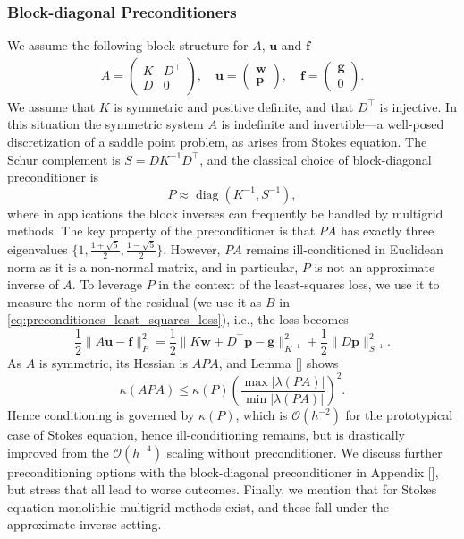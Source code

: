\documentclass{article} %
\begin{document}
\subsubsection{Block-diagonal Preconditioners} We assume the following block structure for $A$, $\mathbf u$ and $\mathbf f$
\begin{align*}
   A = 
   \begin{pmatrix}
      K & D^\top \\ 
      D & 0   
   \end{pmatrix},
   \quad
   \mathbf u = 
   \begin{pmatrix}
      \mathbf w \\
      \mathbf p
   \end{pmatrix},
   \quad
   \mathbf f =
   \begin{pmatrix}
      \mathbf g \\
      0
   \end{pmatrix}.
\end{align*}
We assume that $K$ is symmetric and positive definite, and that $D^\top$ is injective. In this situation the symmetric system $A$ is indefinite and invertible---a well-posed discretization of a saddle point problem, as arises from Stokes equation. The Schur complement is $S=DK^{-1}D^\top$, and the classical choice of block-diagonal preconditioner is
\begin{equation*}
   P \approx \operatorname{diag}(K^{-1}, S^{-1}),
\end{equation*}
where in applications the block inverses can frequently be handled by multigrid methods. The key property of the preconditioner is that $PA$ has exactly three eigenvalues $\{ 1, \frac{1+\sqrt 5}{2}, \frac{1-\sqrt 5}{2} \}$. However, $PA$ remains ill-conditioned in Euclidean norm as it is a non-normal matrix, and in particular, $P$ is not an approximate inverse of $A$. To leverage $P$ in the context of the least-squares loss, we use it to measure the norm of the residual (we use it as $B$ in \eqref{eq:preconditiones_least_squares_loss}), i.e., the loss becomes
\begin{equation*}
   \frac{1}{2} \| A\mathbf u - \mathbf f \|^2_P 
   =
   \frac12 \| K\mathbf w + D^\top \mathbf p - \mathbf g \|^2_{K^{-1}} + \frac12 \| D\mathbf p \|^2_{S^{-1}}.
\end{equation*}
As $A$ is symmetric, its Hessian is $APA$, and Lemma [] shows 
\begin{equation*}
   \kappa(APA) \leq \kappa(P)\left(\frac{\max|\lambda(PA)|}{\min|\lambda(PA)|}\right)^2.
\end{equation*}
Hence conditioning is governed by $\kappa(P)$, which is $\mathcal O(h^{-2})$ for the prototypical case of Stokes equation, hence ill-conditioning remains, but is drastically improved from the $\mathcal O(h^{-4})$ scaling without preconditioner. We discuss further preconditioning options with the block-diagonal preconditioner in Appendix [], but stress that all lead to worse outcomes. Finally, we mention that for Stokes equation monolithic multigrid methods exist, and these fall under the approximate inverse setting.
\end{document}

